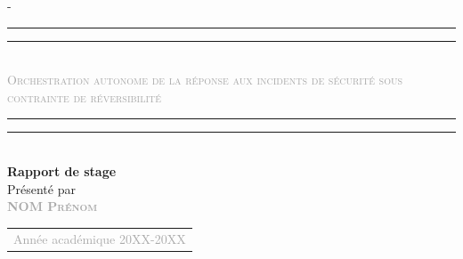 \begin{titlingpage}
\begin{SingleSpace}
\begin{adjustwidth*}{\unitlength}{-\unitlength}
\begin{figure}
\centering
\end{figure}
\hspace{3cm}
\vspace{0.5cm}
\begin{center}
\rule[0.5ex]{\linewidth}{2pt}\vspace*{-\baselineskip}\vspace*{3.2pt}
\rule[0.5ex]{\linewidth}{1pt}\\[\baselineskip]
{\LARGE{\textcolor{darkgray}{\textsc{Orchestration autonome de la r\'eponse aux incidents
de s\'ecurit\'e sous contrainte de r\'eversibilit\'e}}}}\\[4mm]
\rule[0.5ex]{\linewidth}{1pt}\vspace*{-\baselineskip}\vspace{3.2pt}
\rule[0.5ex]{\linewidth}{2pt}\\
\vspace{6mm}
{\Large \textbf{Rapport de stage}}\\
\vspace{6mm}
{\Large Pr\'esent\'e par} \\
\vspace{6mm}
{\Large \textsc{\textbf{\textcolor{darkgray}{NOM Pr\'enom}}}}\\
\vspace{8mm}
\vspace{4.5mm}
\begin{tabular}{c}
{\Large \textcolor{darkgray}{Ann\'ee acad\'emique 20XX-20XX}}\\
\end{tabular}
\end{center}
\end{adjustwidth*}
\end{SingleSpace}
\end{titlingpage}
